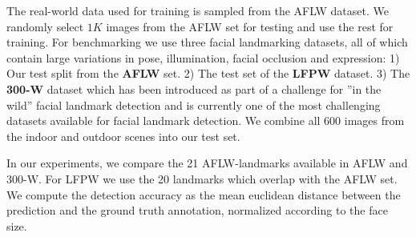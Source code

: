 \documentclass[10pt,twocolumn,letterpaper]{article}
\begin{document}
	The real-world data used for training is sampled from the AFLW \cite{koestinger11a} dataset. We randomly select $1K$ images from the AFLW set for testing and use the rest for training. For benchmarking we use three facial landmarking datasets, all of which contain large variations in pose, illumination, facial occlusion and expression: 1) Our test split from the \textbf{AFLW} set. 2) The test set of the \textbf{LFPW}\cite{belhumeur2013localizing} dataset.  3) The \textbf{300-W}\cite{sagonas2013300} dataset which has been introduced as part of a challenge for ''in the wild'' facial landmark detection and is currently one of the most challenging datasets available for facial landmark detection. We combine all 600 images from the indoor and outdoor scenes into our test set.

	In our experiments, we compare the 21 AFLW-landmarks available in AFLW and 300-W. For LFPW we use the 20 landmarks which overlap with the AFLW set. We compute the detection accuracy as the mean euclidean distance between the prediction and the ground truth annotation, normalized according to the face size. 
\end{document}
